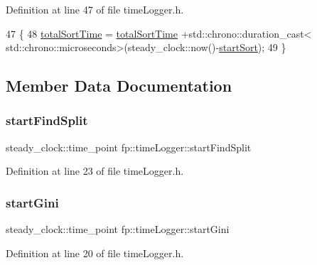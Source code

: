 Definition at line 47 of file time\+Logger.\+h.


\begin{DoxyCode}
47                                        \{
48                 \hyperlink{classfp_1_1timeLogger_a3ac30f8dba0551c3cd3f57dc4806e56e}{totalSortTime} = \hyperlink{classfp_1_1timeLogger_a3ac30f8dba0551c3cd3f57dc4806e56e}{totalSortTime} +std::chrono::duration\_cast<
      std::chrono::microseconds>(steady\_clock::now()-\hyperlink{classfp_1_1timeLogger_afed53c702d6f414558eb7ca49f37ff22}{startSort});
49             \}
\end{DoxyCode}


\subsection{Member Data Documentation}
\mbox{\label{classfp_1_1timeLogger_a1783656ae0d2e107cdfa87766ddc1a8c}} 
\subsubsection{\texorpdfstring{start\+Find\+Split}{startFindSplit}}
{\footnotesize\ttfamily steady\+\_\+clock\+::time\+\_\+point fp\+::time\+Logger\+::start\+Find\+Split}



Definition at line 23 of file time\+Logger.\+h.

\mbox{\label{classfp_1_1timeLogger_abe0bd7eeb79ad8c33747afb4f4a99e88}} 
\subsubsection{\texorpdfstring{start\+Gini}{startGini}}
{\footnotesize\ttfamily steady\+\_\+clock\+::time\+\_\+point fp\+::time\+Logger\+::start\+Gini}



Definition at line 20 of file time\+Logger.\+h.

\mbox{\label{classfp_1_1timeLogger_a530aa42af210e19fbab96c998271dbc4}} 
